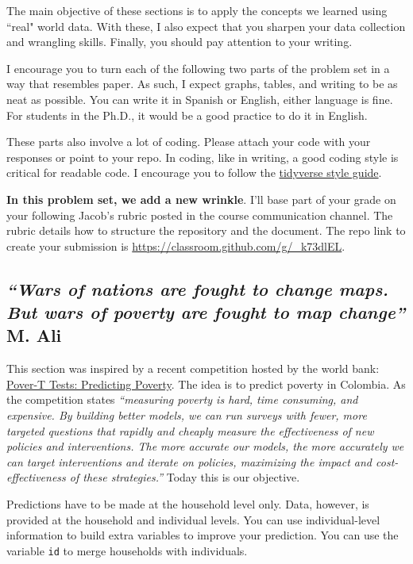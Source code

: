 \documentclass[12pt,onecolumn,A4]{article}
\begin{document}
The main objective of these sections is to apply the concepts we learned using ``real" world data. With these, I also expect that you sharpen your data collection and wrangling skills. Finally, you should pay attention to your writing.

I encourage you to turn each of the following two parts of the problem set in a way that resembles paper. As such, I expect graphs, tables, and writing to be as neat as possible. You can write it in Spanish or English, either language is fine. For students in the Ph.D., it would be a good practice to do it in English.

These parts also involve a lot of coding. Please attach your code with your responses or point to your repo. In coding, like in writing, a good coding style is critical for readable code. I encourage you to follow the \href{https://style.tidyverse.org/}{tidyverse style guide}.

{\bf In this problem set, we add a new wrinkle}. I'll base part of your grade on your following Jacob's rubric posted in the course communication channel. The rubric details how to structure the repository and the document. The repo link to create your submission is \url{https://classroom.github.com/g/_k73dlEL}.

\subsection{{\it ``Wars of nations are fought to change maps. But wars of poverty are fought to map change''} M. Ali}

This section was inspired by a recent competition hosted by the world bank: \href{https://www.drivendata.org/competitions/50/worldbank-poverty-prediction/page/97/}{Pover-T Tests: Predicting Poverty}. The idea is to predict poverty in Colombia. As the competition states {\it ``measuring poverty is hard, time consuming, and expensive. By building better models, we can run surveys with fewer, more targeted questions that rapidly and cheaply measure the effectiveness of new policies and interventions. The more accurate our models, the more accurately we can target interventions and iterate on policies, maximizing the impact and cost-effectiveness of these strategies.''} Today this is our objective.

Predictions have to be made at the household level only. Data, however, is provided at the household and individual levels. You can use individual-level information to build extra variables to improve your prediction. You can use the variable \texttt{id} to merge households with individuals. 
\end{document}
